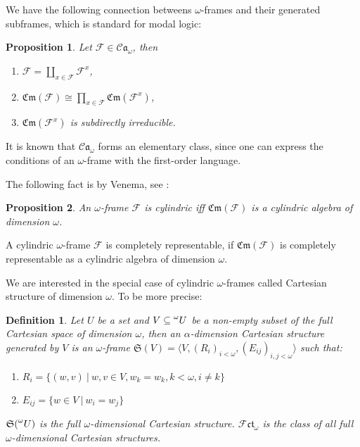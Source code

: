 \documentclass[a4paper]{article}
\theoremstyle{defin}
\newtheorem{defin}{Definition}
\theoremstyle{theorem}
\theoremstyle{claim}
\theoremstyle{prop}
\newtheorem{prop}{Proposition}
\theoremstyle{lemma}
\theoremstyle{fact}
\theoremstyle{ex}
\theoremstyle{col}
\begin{document}
We have the following connection betweens $\omega$-frames and their generated subframes, which is standard for modal logic:
\begin{prop}
Let $\mathcal{F} \in \mathcal{C}\mathfrak{a}_{\omega}$, then
\begin{enumerate}
\item $\mathcal{F} = \coprod \limits_{x \in \mathcal{F}} \mathcal{F}^{x}$,
\item $\mathfrak{Cm}(\mathcal{F}) \cong \prod \limits_{x \in \mathcal{F}} \mathfrak{Cm}(\mathcal{F}^{x})$,
\item $\mathfrak{Cm}(\mathcal{F}^{x})$ is subdirectly irreducible.
\end{enumerate}
\end{prop}

It is known that $\mathcal{C}\mathfrak{a}_{\omega}$ forms an elementary class, since one can express the conditions of an $\omega$-frame with the first-order language.

The following fact is by Venema, see \cite[Proposition 2.1.5]{Venema2013}:
\begin{prop}
An $\omega$-frame $\mathcal{F}$ is cylindric iff $\mathfrak{Cm}(\mathcal{F})$ is a cylindric algebra of dimension $\omega$.
\end{prop}
A cylindric $\omega$-frame $\mathcal{F}$ is completely representable, if $\mathfrak{Cm}(\mathcal{F})$ is completely representable as a cylindric algebra of dimension $\omega$.

We are interested in the special case of cylindric $\omega$-frames called Cartesian structure of dimension $\omega$. To be more precise:

\begin{defin}
Let $U$ be a set and $V \subseteq \prescript{\omega}{}U$ be a non-empty subset of the full Cartesian space of dimension $\omega$, then an $\alpha$-dimension Cartesian structure generated by $V$ is an $\omega$-frame $\mathfrak{S}(V) = \langle V, (R_{i})_{i < \omega}, (E_{ij})_{i, j < \omega} \rangle$ such that:
\begin{enumerate}
\item $R_i = \{ (w, v) \: | \: w, v \in V, w_k = w_k, k < \omega, i \neq k \}$
\item $E_{ij} = \{ w \in V \: | \: w_i = w_j \}$
\end{enumerate}
$\mathfrak{S}(\prescript{\omega}{}U)$ is the full $\omega$-dimensional Cartesian structure. $\mathcal{F} \mathfrak{c}\mathfrak{t}_{\omega}$ is the class of all full $\omega$-dimensional Cartesian structures.
\end{defin}
\end{document}
